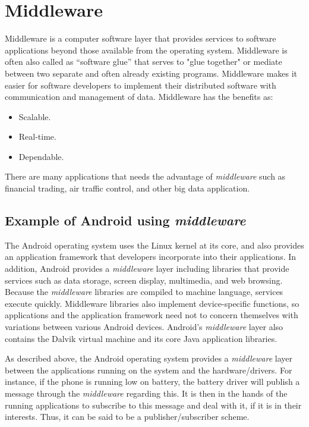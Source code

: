 \section{Middleware}
Middleware is a computer software layer that provides services to software applications beyond those available from the operating system. Middleware is often also called as “software glue” that serves to "glue together" or mediate between two separate and often already existing programs. Middleware makes it easier for software developers to implement their distributed software with communication and management of data.
Middleware has the benefits as:

\begin{itemize}
\item Scalable.
\item Real-time.
\item Dependable.
\end{itemize}

There are many applications that needs the advantage of \emph{middleware} such as financial trading, air traffic control, and other big data application.

\subsection{Example of Android using \emph{middleware}}
The Android operating system uses the Linux kernel at its core, and also provides an application framework that developers incorporate into their applications. In addition, Android provides a \emph{middleware} layer including libraries that provide services such as data storage, screen display, multimedia, and web browsing. Because the \emph{middleware} libraries are compiled to machine language, services execute quickly. Middleware libraries also implement device-specific functions, so applications and the application framework need not to concern themselves with variations between various Android devices. Android’s \emph{middleware} layer also contains the Dalvik virtual machine and its core Java application libraries.\cite{wiki_android}

As described above, the Android operating system provides a \emph{middleware} layer between the applications running on the system and the hardware/drivers. For instance, if the phone is running low on battery, the battery driver will publish a message through the \emph{middleware} regarding this. It is then in the hands of the running applications to subscribe to this message and deal with it, if it is in their interests. Thus, it can be said to be a publisher/subscriber scheme.

